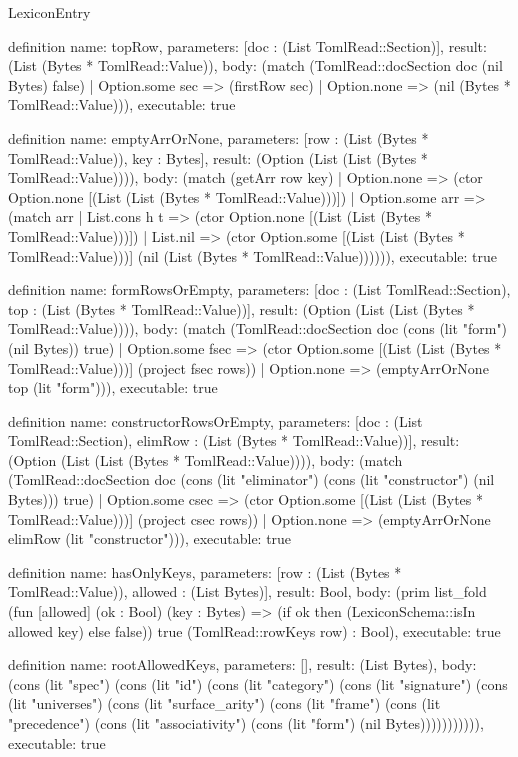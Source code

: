 \begin{lexlean}{LexiconEntry}
\begin{semanticmodule}
definition{
  name: topRow,
  parameters: [doc : (List TomlRead::Section)],
  result: (List (Bytes * TomlRead::Value)),
  body: (match (TomlRead::docSection doc (nil Bytes) false)
    | Option.some sec => (firstRow sec)
    | Option.none => (nil (Bytes * TomlRead::Value))),
  executable: true
}

definition{
  name: emptyArrOrNone,
  parameters: [row : (List (Bytes * TomlRead::Value)), key : Bytes],
  result: (Option (List (List (Bytes * TomlRead::Value)))),
  body: (match (getArr row key)
    | Option.none => (ctor Option.none [(List (List (Bytes * TomlRead::Value)))])
    | Option.some arr => (match arr
      | List.cons h t => (ctor Option.none [(List (List (Bytes * TomlRead::Value)))])
      | List.nil => (ctor Option.some [(List (List (Bytes * TomlRead::Value)))] (nil (List (Bytes * TomlRead::Value)))))),
  executable: true
}

definition{
  name: formRowsOrEmpty,
  parameters: [doc : (List TomlRead::Section), top : (List (Bytes * TomlRead::Value))],
  result: (Option (List (List (Bytes * TomlRead::Value)))),
  body: (match (TomlRead::docSection doc (cons (lit "form") (nil Bytes)) true)
    | Option.some fsec => (ctor Option.some [(List (List (Bytes * TomlRead::Value)))] (project fsec rows))
    | Option.none => (emptyArrOrNone top (lit "form"))),
  executable: true
}

definition{
  name: constructorRowsOrEmpty,
  parameters: [doc : (List TomlRead::Section), elimRow : (List (Bytes * TomlRead::Value))],
  result: (Option (List (List (Bytes * TomlRead::Value)))),
  body: (match (TomlRead::docSection doc (cons (lit "eliminator") (cons (lit "constructor") (nil Bytes))) true)
    | Option.some csec => (ctor Option.some [(List (List (Bytes * TomlRead::Value)))] (project csec rows))
    | Option.none => (emptyArrOrNone elimRow (lit "constructor"))),
  executable: true
}

definition{
  name: hasOnlyKeys,
  parameters: [row : (List (Bytes * TomlRead::Value)), allowed : (List Bytes)],
  result: Bool,
  body: (prim list_fold (fun [allowed] (ok : Bool) (key : Bytes) => (if ok then (LexiconSchema::isIn allowed key) else false)) true (TomlRead::rowKeys row) : Bool),
  executable: true
}

definition{
  name: rootAllowedKeys,
  parameters: [],
  result: (List Bytes),
  body: (cons (lit "spec") (cons (lit "id") (cons (lit "category") (cons (lit "signature") (cons (lit "universes") (cons (lit "surface_arity") (cons (lit "frame") (cons (lit "precedence") (cons (lit "associativity") (cons (lit "form") (nil Bytes))))))))))),
  executable: true
}


\end{semanticmodule}
\end{lexlean}
